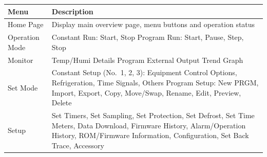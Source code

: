 \documentclass{article}
\begin{document}
\begin{longtable}[]{@{}|l|l|@{}}
\toprule
\rowcolor{magenta}\begin{minipage}[b]{0.13\columnwidth}\raggedright
{\bf{Menu}}\strut
\end{minipage} & \begin{minipage}[b]{0.81\columnwidth}\raggedright
{\bf{Description}}\strut
\end{minipage}\tabularnewline
\midrule
\endhead
\begin{minipage}[t]{0.13\columnwidth}\raggedright
Home Page\strut
\end{minipage} & \begin{minipage}[t]{0.81\columnwidth}\raggedright
Display main overview page, menu buttons and operation status\strut
\end{minipage}\tabularnewline
\begin{minipage}[t]{0.13\columnwidth}\raggedright
Operation Mode\strut
\end{minipage} & \begin{minipage}[t]{0.81\columnwidth}\raggedright
Constant Run: Start, Stop Program Run: Start, Pause, Step, Stop\strut
\end{minipage}\tabularnewline
\begin{minipage}[t]{0.13\columnwidth}\raggedright
Monitor\strut
\end{minipage} & \begin{minipage}[t]{0.81\columnwidth}\raggedright
Temp/Humi Details Program External Output Trend Graph\strut
\end{minipage}\tabularnewline
\begin{minipage}[t]{0.13\columnwidth}\raggedright
Set Mode\strut
\end{minipage} & \begin{minipage}[t]{0.81\columnwidth}\raggedright
Constant Setup (No.~1, 2, 3): Equipment Control Options, Refrigeration,
Time Signals, Others Program Setup: New PRGM, Import, Export, Copy,
Move/Swap, Rename, Edit, Preview, Delete\strut
\end{minipage}\tabularnewline
\begin{minipage}[t]{0.13\columnwidth}\raggedright
Setup\strut
\end{minipage} & \begin{minipage}[t]{0.81\columnwidth}\raggedright
Set Timers, Set Sampling, Set Protection, Set Defrost, Set Time Meters,
Data Download, Firmware History, Alarm/Operation History, ROM/Firmware
Information, Configuration, Set Back Trace, Accessory\strut
\end{minipage}\tabularnewline
\bottomrule
\end{longtable}
\end{document}
